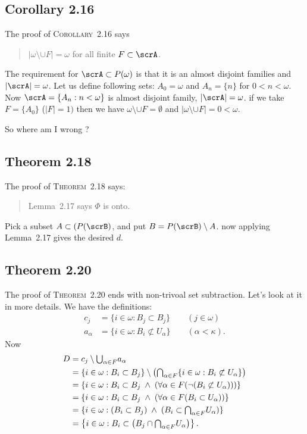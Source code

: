 \subsection{Corollary 2.16}

The proof of \textsc{Corollary}~2.16 says
\begin{quote}
 \(|\omega \setminus \cup F|=\omega\) for all finite \(F\subset \scrA\).
\end{quote}
The requirement for \(\scrA\subset P(\omega)\) is that 
it is an almost disjoint families and \(|\scrA|=\omega\).
Let us define following sets:
\(A_0=\omega\) and \(A_n = \{n\}\) for \(0 < n < \omega\).
Now \(\scrA = \{A_n: n < \omega\}\) is almost disjoint family, 
\(|\scrA| = \omega\).
 if we take \(F=\{A_0\}\) (\(|F|=1)\)
then we have \(\omega \setminus \cup F = \emptyset\)
and \(|\omega \setminus \cup F| = 0 < \omega\).

So where am I wrong ?

\subsection{Theorem 2.18}

The proof of \textsc{Theorem}~2.18 says:
\begin{quote}
Lemma~2.17 says \(\Phi\) is onto.
\end{quote}
Pick a subset \(A\subset(P(\scrB)\), and put \(B=P(\scrB)\setminus A\).
now applying Lemma~2.17 gives the desired $d$.

\subsection{Theorem 2.20}

The proof of \textsc{Theorem}~2.20 ends
with non-trivoal set subtraction.
Let's look at it in more details.
We have the definitions:
\begin{align*}
c_j &= \{i\in\omega: B_j \subset B_j\} \qquad(j\in\omega) \\
a_\alpha &= \{i\in\omega: B_i \not\subset U_\alpha\} \qquad(\alpha<\kappa).
\end{align*}
Now
\begin{align*}
D &= c_j \setminus \mathsmaller{\bigcup_{\alpha\in F}} a_\alpha \\
  &= \{i\in\omega: B_i \subset B_j\}
    \setminus
    \left(\mathsmaller{\bigcap_{\alpha\in F}} 
      \{i\in\omega: B_i \not\subset U_\alpha\}\right)  \\
  &= \{i\in\omega: B_i \subset B_j\;\land\;
       \left(\forall \alpha\in F (\lnot (B_i \not\subset U_\alpha))\right)\} \\
  &= \{i\in\omega: B_i \subset B_j\;\land\;
       \left(\forall \alpha\in F (B_i \subset U_\alpha)\right)\} \\
  &= \{i\in\omega: (B_i \subset B_j)\;\land\;
       (B_i \subset \mathsmaller{\bigcap_{\alpha\in F}} U_\alpha)\} \\
  &= \left\{i\in\omega: B_i \subset 
    \left(B_j\cap\mathsmaller{\bigcap_{\alpha\in F}} U_\alpha\right)\right\}.
\end{align*}

